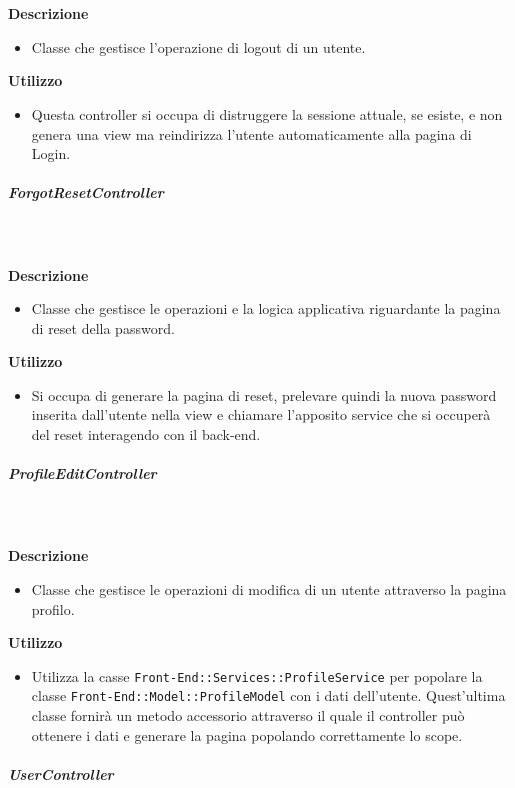        \textbf{\\ \\ Descrizione} 
          \begin{itemize}
            \item[] Classe che gestisce l'operazione di logout di un utente.
          \end{itemize}      
        \textbf{Utilizzo}  
          \begin{itemize}
            \item[] Questa controller si occupa di distruggere la sessione attuale, se esiste, e non genera una view ma reindirizza l'utente automaticamente alla pagina di Login.
          \end{itemize}
      \subparagraph{ForgotResetController}
        
        \textbf{\\ \\ Descrizione} 
          \begin{itemize}
            \item[] Classe che gestisce le operazioni e la logica applicativa riguardante la pagina di reset della password.
          \end{itemize}      
        \textbf{Utilizzo}  
          \begin{itemize}
            \item[] Si occupa di generare la pagina di reset, prelevare quindi la nuova password inserita dall'utente nella view e chiamare l'apposito service che si occuperà del reset interagendo con il back-end.
          \end{itemize}
      \subparagraph{ProfileEditController}
        
        \textbf{\\ \\ Descrizione} 
          \begin{itemize}
            \item[] Classe che gestisce le operazioni di modifica di un utente attraverso la pagina profilo.
          \end{itemize}      
        \textbf{Utilizzo}  
          \begin{itemize}
            \item[] Utilizza la casse \texttt{Front-End::Services::ProfileService} per popolare la classe \texttt{Front-End::Model::ProfileModel} con i dati dell'utente. Quest'ultima classe fornirà un metodo accessorio attraverso il quale il controller può ottenere i dati e generare la pagina popolando correttamente lo scope.
          \end{itemize}
      \subparagraph{UserController}
        
